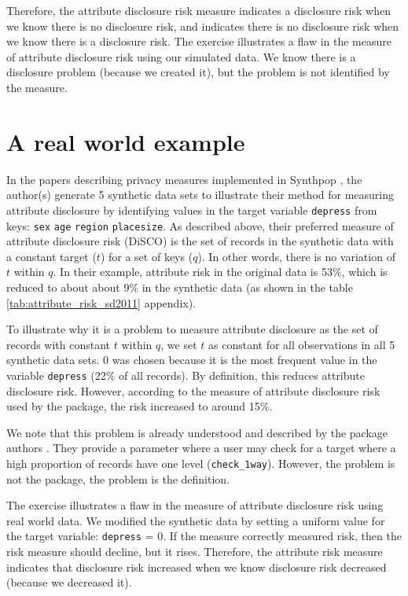 \documentclass[a4paper,11pt]{style/uneceart}
\begin{document}
Therefore, the attribute disclosure risk measure indicates a disclosure risk when we know there is no disclosure risk, and indicates there is no disclosure risk when we know there is a disclosure risk.  The exercise illustrates a flaw in the measure of attribute disclosure risk using our simulated data.  We know there is a disclosure problem (because we created it), but the problem is not identified by the measure.  

\section{A real world example}

In the papers describing privacy measures implemented in Synthpop \cite{raab2024privacy,raab2025practicalprivacymetricssynthetic}, the author(s) generate 5 synthetic data sets to illustrate their method for measuring attribute disclosure by identifying values in the target variable \texttt{depress} from keys: \texttt{sex} \texttt{age} \texttt{region} \texttt{placesize}.  As described above, their preferred measure of attribute disclosure risk (DiSCO) is the set of records in the synthetic data with a constant target ($t$) for a set of keys ($q$).  In other words, there is no variation of $t$ within $q$.  In their example, attribute risk in the original data is 53\%, which is reduced to about about 9\% in the synthetic data (as shown in the table \ref{tab:attribute_risk_sd2011} appendix).  

To illustrate why it is a problem to measure attribute disclosure as the set of records with constant $t$ within $q$, we set $t$ as constant for all observations in all 5 synthetic data sets.  0 was chosen because it is the most frequent value in the variable \texttt{depress} (22\% of all records).  By definition, this reduces attribute disclosure risk.  However, according to the measure of attribute disclosure risk used by the package, the risk increased to around 15\%.

We note that this problem is already understood and described by the package authors \cite{raab2025practicalprivacymetricssynthetic}.  They provide a parameter where a user may check for a target where a high proportion of records have one level (\texttt{check\_1way}).  However, the problem is not the package, the problem is the definition.

The exercise illustrates a flaw in the measure of attribute disclosure risk using real world data.  We modified the synthetic data by setting a uniform value for the target variable: \texttt{depress} = 0.  If the measure correctly measured risk, then the risk measure should decline, but it rises.  Therefore, the attribute risk measure indicates that disclosure risk increased when we know disclosure risk decreased (because we decreased it).  
\end{document}
